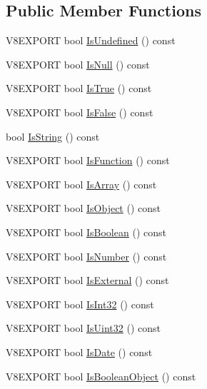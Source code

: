 \subsection*{Public Member Functions}
\begin{DoxyCompactItemize}
\item 
V8\+E\+X\+P\+O\+R\+T bool \hyperlink{classv8_1_1_value_adeeae3576aecadc4176f94a415a70a90}{Is\+Undefined} () const 
\item 
V8\+E\+X\+P\+O\+R\+T bool \hyperlink{classv8_1_1_value_a0757712320a9bcfe5fc0a099524d986f}{Is\+Null} () const 
\item 
V8\+E\+X\+P\+O\+R\+T bool \hyperlink{classv8_1_1_value_ae93277798682f4be9adc204a16c40591}{Is\+True} () const 
\item 
V8\+E\+X\+P\+O\+R\+T bool \hyperlink{classv8_1_1_value_a265c208159ff3163ecda1e9f71b99115}{Is\+False} () const 
\item 
bool \hyperlink{classv8_1_1_value_ab23a34b7df62806808e01b0908bf5f00}{Is\+String} () const 
\item 
V8\+E\+X\+P\+O\+R\+T bool \hyperlink{classv8_1_1_value_a33f329c93a9f417e2d05b438e6e5429c}{Is\+Function} () const 
\item 
V8\+E\+X\+P\+O\+R\+T bool \hyperlink{classv8_1_1_value_a95c39ad189c09630dd90ee5c1a7e89a1}{Is\+Array} () const 
\item 
V8\+E\+X\+P\+O\+R\+T bool \hyperlink{classv8_1_1_value_a360f1fe4a8ee74382f571a12eb14a222}{Is\+Object} () const 
\item 
V8\+E\+X\+P\+O\+R\+T bool \hyperlink{classv8_1_1_value_a6baff625780eac51413f2392250e81be}{Is\+Boolean} () const 
\item 
V8\+E\+X\+P\+O\+R\+T bool \hyperlink{classv8_1_1_value_a32003b217768f535a4728bbd16ebd7d5}{Is\+Number} () const 
\item 
V8\+E\+X\+P\+O\+R\+T bool \hyperlink{classv8_1_1_value_a7aed90ede9bf48b10f18cdb97d50fd1e}{Is\+External} () const 
\item 
V8\+E\+X\+P\+O\+R\+T bool \hyperlink{classv8_1_1_value_a70d4afaccc7903e6a01f40a46ad04188}{Is\+Int32} () const 
\item 
V8\+E\+X\+P\+O\+R\+T bool \hyperlink{classv8_1_1_value_a2674a47b2550eb456a7ecfaf09d2f97e}{Is\+Uint32} () const 
\item 
V8\+E\+X\+P\+O\+R\+T bool \hyperlink{classv8_1_1_value_abcdd87539238a68f8337bae7d0a9c1ac}{Is\+Date} () const 
\item 
V8\+E\+X\+P\+O\+R\+T bool \hyperlink{classv8_1_1_value_aebb6cd7cbb34771df1973aef2e544931}{Is\+Boolean\+Object} () const 

\end{DoxyCompactItemize}

